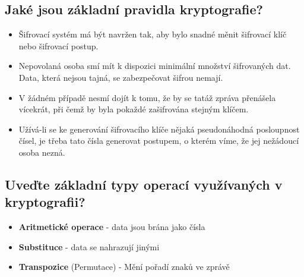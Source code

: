 \subsection{Jaké jsou základní pravidla kryptografie?}
\begin{itemize}
    \item Šifrovací systém má být navržen tak, aby bylo snadné měnit šifrovací klíč nebo šifrovací postup.
    \item Nepovolaná osoba smí mít k dispozici minimální množství šifrovaných dat. Data, která nejsou tajná,
    se zabezpečovat šifrou nemají.
    \item  V žádném případě nesmí dojít k tomu, že by se tatáž zpráva přenášela vícekrát, při čemž by byla 
    pokaždé zašifrována stejným klíčem.
    \item Užívá-li se ke generování šifrovacího klíče nějaká pseudonáhodná posloupnost čísel, je
    třeba tato čísla generovat postupem, o kterém víme, že jej nežádoucí osoba nezná.
\end{itemize}

\subsection{Uveďte základní typy operací využívaných v kryptografii?}
\begin{itemize}
    \item \textbf{Aritmetické operace} - data jsou brána jako čísla
    \item \textbf{Substituce} - data se nahrazují jinými
    \item \textbf{Transpozice} (Permutace) - Mění pořadí znaků ve zprávě
\end{itemize}

